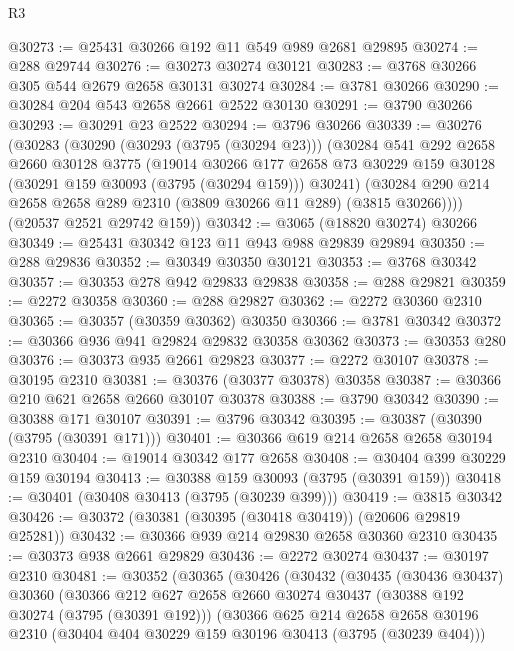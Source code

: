 \begin{lexlean}{R3}
\begin{coremodule}
@30273 := @25431 @30266 @192 @11 @549 @989 @2681 @29895
@30274 := @288 @29744
@30276 := @30273 @30274 @30121
@30283 := @3768 @30266 @305 @544 @2679 @2658 @30131 @30274
@30284 := @3781 @30266
@30290 := @30284 @204 @543 @2658 @2661 @2522 @30130
@30291 := @3790 @30266
@30293 := @30291 @23 @2522
@30294 := @3796 @30266
@30339 := @30276
    (@30283
      (@30290
        (@30293 (@3795 (@30294 @23)))
        (@30284
          @541
          @292
          @2658
          @2660
          @30128
          @3775
          (@19014
            @30266
            @177
            @2658
            @73
            @30229
            @159
            @30128
            (@30291 @159 @30093 (@3795 (@30294 @159)))
            @30241)
          (@30284 @290 @214 @2658 @2658 @289 @2310 (@3809 @30266 @11 @289) (@3815 @30266))))
      (@20537 @2521 @29742 @159))
@30342 := @3065 (@18820 @30274) @30266
@30349 := @25431 @30342 @123 @11 @943 @988 @29839 @29894
@30350 := @288 @29836
@30352 := @30349 @30350 @30121
@30353 := @3768 @30342
@30357 := @30353 @278 @942 @29833 @29838
@30358 := @288 @29821
@30359 := @2272 @30358
@30360 := @288 @29827
@30362 := @2272 @30360 @2310
@30365 := @30357 (@30359 @30362) @30350
@30366 := @3781 @30342
@30372 := @30366 @936 @941 @29824 @29832 @30358 @30362
@30373 := @30353 @280
@30376 := @30373 @935 @2661 @29823
@30377 := @2272 @30107
@30378 := @30195 @2310
@30381 := @30376 (@30377 @30378) @30358
@30387 := @30366 @210 @621 @2658 @2660 @30107 @30378
@30388 := @3790 @30342
@30390 := @30388 @171 @30107
@30391 := @3796 @30342
@30395 := @30387 (@30390 (@3795 (@30391 @171)))
@30401 := @30366 @619 @214 @2658 @2658 @30194 @2310
@30404 := @19014 @30342 @177 @2658
@30408 := @30404 @399 @30229 @159 @30194
@30413 := @30388 @159 @30093 (@3795 (@30391 @159))
@30418 := @30401 (@30408 @30413 (@3795 (@30239 @399)))
@30419 := @3815 @30342
@30426 := @30372 (@30381 (@30395 (@30418 @30419)) (@20606 @29819 @25281))
@30432 := @30366 @939 @214 @29830 @2658 @30360 @2310
@30435 := @30373 @938 @2661 @29829
@30436 := @2272 @30274
@30437 := @30197 @2310
@30481 := @30352
    (@30365
      (@30426
        (@30432
          (@30435
            (@30436 @30437)
            @30360
            (@30366
              @212
              @627
              @2658
              @2660
              @30274
              @30437
              (@30388 @192 @30274 (@3795 (@30391 @192)))
              (@30366
                @625
                @214
                @2658
                @2658
                @30196
                @2310
                (@30404 @404 @30229 @159 @30196 @30413 (@3795 (@30239 @404)))

\end{coremodule}
\end{lexlean}
